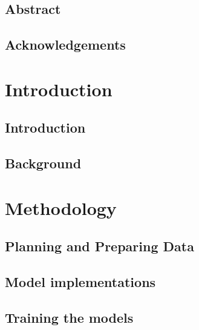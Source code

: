 \documentclass[UKenglish]{ifimaster}
\title{\problemStatement}
\subtitle{
}
\author{Joakim I. Frogner}
\begin{document}
\duoforside[dept={Department of Informatics},
program={Programming and Networks},
long]

\frontmatter{}
\chapter*{Abstract}


\chapter*{Acknowledgements}


\tableofcontents{} 
\listoffigures{}
\listoftables{}

\mainmatter{}
\part{Introduction}

\chapter{Introduction}
\label{chapter:introduction}


\chapter{Background}
\label{chapter:background}


\part{Methodology}
\chapter{Planning and Preparing Data}
\label{chapter:planning}


\chapter{Model implementations}
\label{chapter:models}


\chapter{Training the models}
\label{chapter:training}

\end{document}
